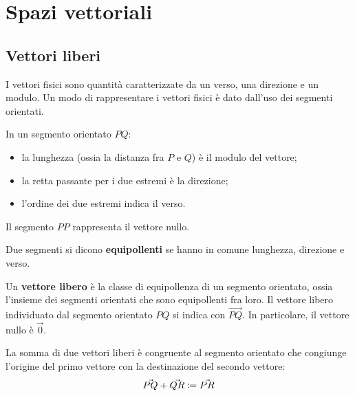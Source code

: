 \section{Spazi vettoriali}

\subsection{Vettori liberi}

I vettori fisici sono quantità caratterizzate da un verso, una direzione e un modulo.
Un modo di rappresentare i vettori fisici è dato dall'uso dei segmenti orientati.

\begin{center}
\end{center}
In un segmento orientato $PQ$:
\begin{itemize}
  \item la lunghezza (ossia la distanza fra $P$ e $Q$) è il modulo del vettore;
  \item la retta passante per i due estremi è la direzione;
  \item l'ordine dei due estremi indica il verso.
\end{itemize}
Il segmento $PP$ rappresenta il vettore nullo.

\begin{definition}[Equipollenza]
  Due segmenti si dicono \textbf{equipollenti} se hanno in comune lunghezza, direzione e verso.
\end{definition}

\begin{definition}
  Un \textbf{vettore libero} è la classe di equipollenza di un segmento orientato, ossia l'insieme dei segmenti orientati che sono equipollenti fra loro. Il vettore libero individuato dal segmento orientato $PQ$ si indica con $\vec{PQ}$. In particolare, il vettore nullo è $\vec{0}$.
\end{definition}

\begin{definition}
  La somma di due vettori liberi è congruente al segmento orientato che congiunge l'origine del primo vettore con la destinazione del secondo vettore:
  $$\vec{PQ}+\vec{QR}\coloneqq\vec{PR}$$
  \begin{center}
  \end{center}
\end{definition}

